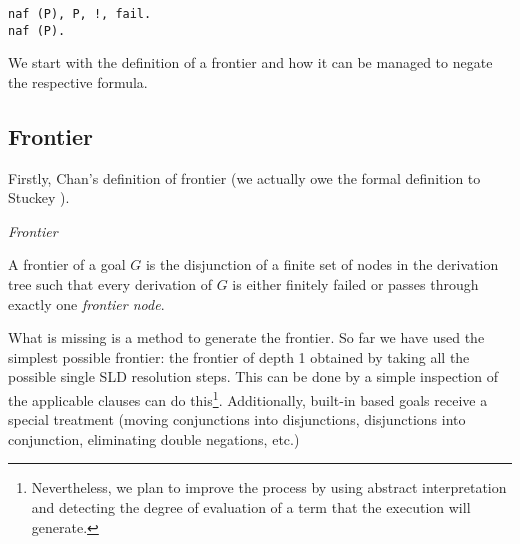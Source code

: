 \documentclass{llncs}
\begin{document}
\begin{verbatim}
naf (P), P, !, fail.
naf (P).
\end{verbatim}

We start with the definition of a frontier and how it can be managed
to negate the respective formula.


\subsection{Frontier}
\label{frontier}

Firstly, Chan's definition of frontier (we actually owe the formal
definition to Stuckey \cite{Stuckey95}).

\begin{definition}{\em Frontier}

A frontier of a goal $G$ is the disjunction of a finite set of nodes
in the derivation tree such that every derivation of $G$ is either
finitely failed or passes through exactly one {\em frontier node}.
\end{definition}

What is missing is a method to generate the frontier. So far we have
used the simplest possible frontier: the frontier of depth 1 obtained
by taking all the possible single SLD resolution steps. This can be
done by a simple inspection of the applicable clauses can do
this\footnote{Nevertheless, we plan to improve the process by using abstract
interpretation and detecting the degree of evaluation of a term that
the execution will generate.}.  Additionally, built-in based goals
receive a special treatment (moving conjunctions into disjunctions,
disjunctions into conjunction, eliminating double negations, etc.)
\end{document}
